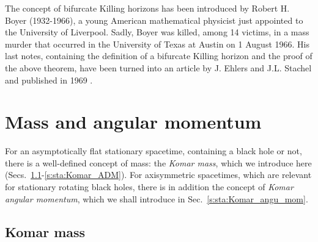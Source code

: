 \begin{hist} \label{h:sta:Boyer}
The concept of bifurcate Killing horizons has been introduced by Robert H. Boyer
(1932-1966), a young American mathematical physicist just appointed to the University
of Liverpool. Sadly, Boyer was killed, among 14 victims, in a mass murder that
occurred in the University of Texas at Austin on 1 August 1966.
His last notes, containing the definition of a bifurcate Killing horizon
and the proof of the above theorem, have been turned into an article
by J. Ehlers and J.L. Stachel and published in 1969 \cite{Boyer69}.
\end{hist}



\section{Mass and angular momentum} \label{s:sta:mass_angul_mom}

For an asymptotically flat stationary spacetime, containing a
black hole or not, there is a well-defined concept of mass: the \emph{Komar mass},
which we introduce here (Secs.~\ref{s:sta:Komar_mass}-\ref{s:sta:Komar_ADM}).
For axisymmetric spacetimes, which are relevant
for stationary rotating black holes, there is in addition the concept
of \emph{Komar angular momentum}, which we shall introduce in Sec.~\ref{s:sta:Komar_angu_mom}.

\subsection{Komar mass} \label{s:sta:Komar_mass}

